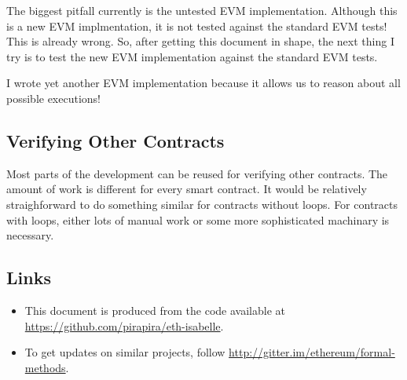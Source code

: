 \documentclass[11pt,a4paper]{article}
\begin{document}
The biggest pitfall currently is the untested EVM implementation.
Although this is a new EVM implmentation, it is not
tested against the standard EVM tests!  This is already wrong.
So, after getting this document in shape, the next thing I try is to
test the new EVM implementation against the standard EVM tests.

I wrote yet another EVM implementation because it allows us to reason about all possible executions!

\subsection{Verifying Other Contracts}

Most parts of the development can be reused for verifying other contracts.
The amount of work is
different for every smart contract.  It would be relatively
straighforward to do something similar for
contracts without loops.  For contracts with loops,
either lots of manual work or some more
sophisticated machinary is necessary.

\subsection{Links}

\begin{itemize}
\item This document is produced from the code available at
\url{https://github.com/pirapira/eth-isabelle}.
\item To get updates on similar projects, follow \url{http://gitter.im/ethereum/formal-methods}.
\end{itemize}



%
%
\end{document}
